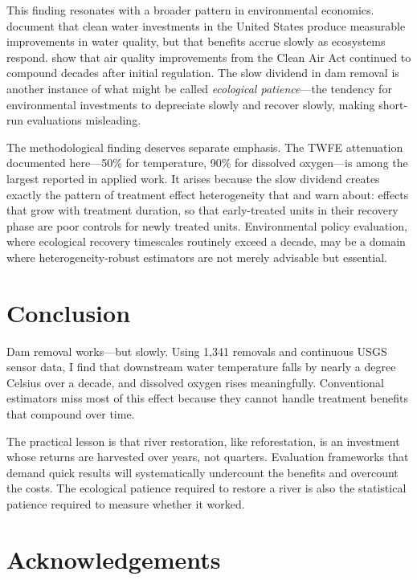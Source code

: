 \documentclass[12pt]{article}
\begin{document}
This finding resonates with a broader pattern in environmental economics. \citet{keiser2019} document that clean water investments in the United States produce measurable improvements in water quality, but that benefits accrue slowly as ecosystems respond. \citet{greenstone2023} show that air quality improvements from the Clean Air Act continued to compound decades after initial regulation. The slow dividend in dam removal is another instance of what might be called \textit{ecological patience}---the tendency for environmental investments to depreciate slowly and recover slowly, making short-run evaluations misleading.

The methodological finding deserves separate emphasis. The TWFE attenuation documented here---50\% for temperature, 90\% for dissolved oxygen---is among the largest reported in applied work. It arises because the slow dividend creates exactly the pattern of treatment effect heterogeneity that \citet{goodmanbacon2021} and \citet{sunab2021} warn about: effects that grow with treatment duration, so that early-treated units in their recovery phase are poor controls for newly treated units. Environmental policy evaluation, where ecological recovery timescales routinely exceed a decade, may be a domain where heterogeneity-robust estimators are not merely advisable but essential.

\section{Conclusion}

Dam removal works---but slowly. Using 1,341 removals and continuous USGS sensor data, I find that downstream water temperature falls by nearly a degree Celsius over a decade, and dissolved oxygen rises meaningfully. Conventional estimators miss most of this effect because they cannot handle treatment benefits that compound over time.

The practical lesson is that river restoration, like reforestation, is an investment whose returns are harvested over years, not quarters. Evaluation frameworks that demand quick results will systematically undercount the benefits and overcount the costs. The ecological patience required to restore a river is also the statistical patience required to measure whether it worked.

\section*{Acknowledgements}
\end{document}
